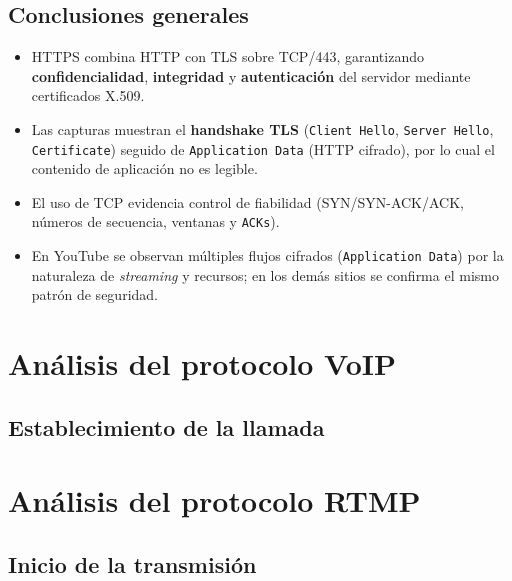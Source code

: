 \documentclass[10pt]{article}
\begin{document}
\subsection*{Conclusiones generales}
\begin{itemize}
    \item HTTPS combina HTTP con TLS sobre TCP/443, garantizando \textbf{confidencialidad}, \textbf{integridad} y \textbf{autenticación} del servidor mediante certificados X.509.
    \item Las capturas muestran el \textbf{handshake TLS} (\texttt{Client Hello}, \texttt{Server Hello}, \texttt{Certificate}) seguido de \texttt{Application Data} (HTTP cifrado), por lo cual el contenido de aplicación no es legible.
    \item El uso de TCP evidencia control de fiabilidad (SYN/SYN-ACK/ACK, números de secuencia, ventanas y \texttt{ACKs}).
    \item En YouTube se observan múltiples flujos cifrados (\texttt{Application Data}) por la naturaleza de \textit{streaming} y recursos; en los demás sitios se confirma el mismo patrón de seguridad.
\end{itemize}



\renewcommand{\thesection}{8.\arabic{section}}
\section{Análisis del protocolo VoIP}
\subsection{Establecimiento de la llamada}


\renewcommand{\thesection}{8.\arabic{section}}
\section{Análisis del protocolo RTMP}
\subsection{Inicio de la transmisión}
\end{document}
